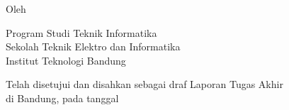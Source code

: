 \clearpage
\pagestyle{empty}

\begin{center}
    \smallskip

    \Large \bfseries \MakeUppercase{\thetitle}
    \vfill

    \subtitle
    \vfill

    \large Oleh

    \Large \theauthor

    \large Program Studi Teknik Informatika \\

    \normalsize \normalfont
    Sekolah Teknik Elektro dan Informatika \\
    Institut Teknologi Bandung

    \thedate
    \vfill
    Telah disetujui dan disahkan sebagai draf Laporan Tugas Akhir \\
    di Bandung, pada tanggal \thedate

    \advisorapproval

\end{center}
\clearpage
